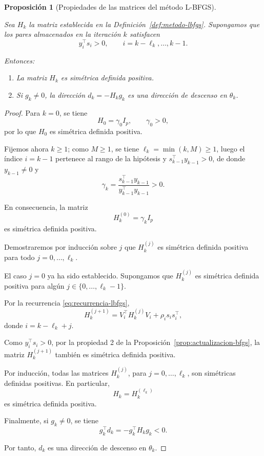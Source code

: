 \documentclass[a4paper,openany,oneside,10pt]{report}
\theoremstyle{pnlTeorema}
\newtheorem{proposicion}{Proposición}[section]
\theoremstyle{pnlDefinicion}
\theoremstyle{pnlObservacion}
\begin{document}
\begin{proposicion}[Propiedades de las matrices del método L-BFGS]
\label{prop:propiedades-lbfgs}

Sea $H_k$ la matriz establecida en la Definición~\ref{def:metodo-lbfgs}.
Supongamos que los pares almacenados en la iteración $k$
satisfacen
\[
    y_i^\top s_i>0,
    \qquad i=k-\ell_k,\ldots,k-1.
\]

Entonces:

\begin{enumerate}
    \item La matriz $H_k$ es simétrica definida positiva.

    \item Si $g_k\neq 0$, la dirección $d_k=-H_k g_k$
    es una dirección de descenso en $\theta_k$.
\end{enumerate}

\end{proposicion}

\begin{proof}

Para $k=0$, se tiene
\[
    H_0=\gamma_0 I_p,\qquad \gamma_0>0,
\]
por lo que $H_0$ es simétrica definida positiva.

Fijemos ahora $k\geq 1$; como $M\geq 1$, se tiene $\ell_k=\min(k,M)\geq 1$, luego el índice $i=k-1$ pertenece al rango de la hipótesis y
$s_{k-1}^\top y_{k-1}>0$, de donde $y_{k-1}\neq 0$ y
\[
    \gamma_k=
    \frac{s_{k-1}^\top y_{k-1}}
    {y_{k-1}^\top y_{k-1}}>0.
\]

En consecuencia, la matriz
\[
    H_k^{(0)}=\gamma_k I_p
\]
es simétrica definida positiva.

Demostraremos por inducción sobre $j$ que $H_k^{(j)}$
es simétrica definida positiva para todo
$j=0,\ldots,\ell_k$.

El caso $j=0$ ya ha sido establecido.
Supongamos que $H_k^{(j)}$ es simétrica definida positiva
para algún $j\in\{0,\ldots,\ell_k-1\}$.

Por la recurrencia \eqref{eq:recurrencia-lbfgs},
\[
    H_k^{(j+1)}
    =V_i^\top H_k^{(j)}V_i
    +\rho_i s_i s_i^\top,
\]
donde $i=k-\ell_k+j$.

Como $y_i^\top s_i>0$, por la propiedad 2 de la
Proposición~\ref{prop:actualizacion-bfgs}, la matriz $H_k^{(j+1)}$ también
es simétrica definida positiva.

Por inducción, todas las matrices $H_k^{(j)}$, para
$j=0,\ldots,\ell_k$, son simétricas definidas positivas.
En particular,
\[
    H_k=H_k^{(\ell_k)}
\]
es simétrica definida positiva.

Finalmente, si $g_k\neq 0$, se tiene
\[
    g_k^\top d_k=-g_k^\top H_k g_k<0.
\]

Por tanto, $d_k$ es una dirección de descenso en
$\theta_k$.
\end{proof}
\end{document}

